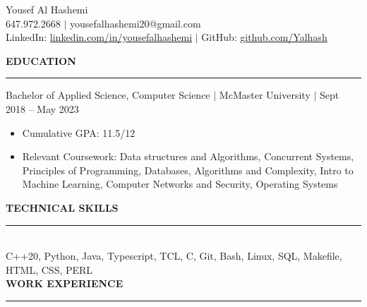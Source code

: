 \documentclass[12pt]{article}
\newcommand{\sectionRule}{\textcolor{gray}{\rule{7.27in}{0.02cm}}}
\newcommand{\sectionTxt}[1]{\noindent\textbf{#1}\\}
\newcommand{\textDate}[3]{\noindent#1 $|$ #2 $|$ {\color{textGray} #3}}
\begin{document}
    \begin{center}
        {\huge Yousef Al Hashemi}\\
        {\normalsize 647.972.2668 $|$ yousefalhashemi20@gmail.com}\\
        {\normalsize LinkedIn: \href{https://www.linkedin.com/in/yousefalhashemi}{linkedin.com/in/yousefalhashemi} $|$ GitHub: \href{https://github.com/Yalhash}{github.com/Yalhash}}\\
    \end{center}

    \sectionTxt{EDUCATION}
    \sectionRule

    \textDate{Bachelor of Applied Science, Computer Science}{McMaster University}{Sept 2018 -- May 2023}
    \begin{small}
        \begin{itemize}
            \itemsep0em 
            \item Cumulative GPA: {11.5/12}
            \item Relevant Coursework: {Data structures and Algorithms, Concurrent Systems, Principles of Programming, Databases, Algorithms and Complexity, Intro to Machine Learning, Computer Networks and Security, Operating Systems}
        \end{itemize}
    \end{small}

    \sectionTxt{TECHNICAL SKILLS}
    \sectionRule \\


    {C++20, Python, Java, Typescript, TCL, C, Git, Bash, Linux, SQL, Makefile, HTML, CSS, PERL} \\


    \sectionTxt{WORK EXPERIENCE}
    \sectionRule
\end{document}
